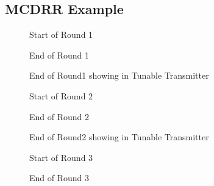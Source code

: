 \documentclass[conference,letterpaper]{IEEEtran}
\begin{document}
\subsection{MCDRR Example}


\begin{figure}[hbtp]
\centering
{}
\caption{Start of Round 1}
\end{figure}



\begin{figure}[hbtp]
\centering
{}
\caption{End of Round 1}
\end{figure}

\begin{figure}[hbtp]
\centering
{}
\caption{End of Round1 showing in Tunable Transmitter}
\end{figure}

\begin{figure}[hbtp]
\centering
{}
\caption{Start of Round 2}
\end{figure}

\begin{figure}[hbtp]
\centering
{}
\caption{End of Round 2}
\end{figure}

\begin{figure}[hbtp]
\centering
{}
\caption{End of Round2 showing in Tunable Transmitter}
\end{figure}

\begin{figure}[hbtp]
\centering
{}
\caption{Start of Round 3}
\end{figure}

\begin{figure}[hbtp]
\centering
{}
\caption{End of Round 3}
\end{figure}
\end{document}
